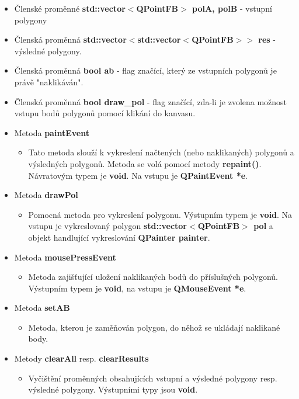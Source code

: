 \documentclass[a4paper, 12pt]{article}
\begin{document}
\begin{itemize}
	\item Členské proměnné \textbf{std::vector$<$QPointFB$>$ polA, polB} - vstupní polygony
	\item Členská proměnná \textbf{std::vector$<$std::vector$<$QPointFB$> >$ res} - výsledné polygony.
	\item Členská proměnná \textbf{bool ab} - flag značící, který ze vstupních polygonů je právě "naklikáván".
	\item Členská proměnná \textbf{bool draw\_pol} - flag značící, zda-li je zvolena možnost vstupu bodů polygonů pomocí klikání do kanvasu.
	\item Metoda \textbf{paintEvent}
		\begin{itemize}
			\item Tato metoda slouží k vykreslení načtených (nebo naklikaných) polygonů a výsledných polygonů. Metoda se volá pomocí metody \textbf{repaint()}. Návratovým typem je \textbf{void}. Na vstupu je \textbf{QPaintEvent *e}.
		\end{itemize}
	\item Metoda \textbf{drawPol}
	\begin{itemize}
		\item Pomocná metoda pro vykreslení polygonu. Výstupním typem je \textbf{void}. Na vstupu je vykreslovaný polygon \textbf{std::vector$<$QPointFB$>$ pol} a objekt handlující vykreslování \textbf{QPainter painter}.
	\end{itemize}
	\item Metoda \textbf{mousePressEvent}
		\begin{itemize}
			\item Metoda zajišťující uložení naklikaných bodů do příslušných polygonů. Výstupním typem je \textbf{void}, na vstupu je \textbf{QMouseEvent *e}.
		\end{itemize}
	\item Metoda \textbf{setAB}
		\begin{itemize}
			\item Metoda, kterou je zaměňován polygon, do něhož se ukládají naklikané body.
		\end{itemize}
	\item Metody \textbf{clearAll} resp. \textbf{clearResults}
		\begin{itemize}
			\item Vyčištění proměnných obsahujících vstupní a výsledné polygony resp. výsledné polygony. Výstupními typy jsou \textbf{void}.
		\end{itemize}

\end{itemize}
\end{document}
